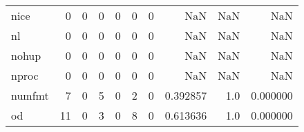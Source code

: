 \begin{longtable}{lrrrrrrrrr}
nice      &                                       0 &                                                  0 &                                                  0 &                                                  0 &                                                  0 &                                                  0 &                                                NaN &                                    NaN &                                  NaN \\
nl        &                                       0 &                                                  0 &                                                  0 &                                                  0 &                                                  0 &                                                  0 &                                                NaN &                                    NaN &                                  NaN \\
nohup     &                                       0 &                                                  0 &                                                  0 &                                                  0 &                                                  0 &                                                  0 &                                                NaN &                                    NaN &                                  NaN \\
nproc     &                                       0 &                                                  0 &                                                  0 &                                                  0 &                                                  0 &                                                  0 &                                                NaN &                                    NaN &                                  NaN \\
numfmt    &                                       7 &                                                  0 &                                                  5 &                                                  0 &                                                  2 &                                                  0 &                                           0.392857 &                                    1.0 &                             0.000000 \\
od        &                                      11 &                                                  0 &                                                  3 &                                                  0 &                                                  8 &                                                  0 &                                           0.613636 &                                    1.0 &                             0.000000 \\

\end{longtable}
